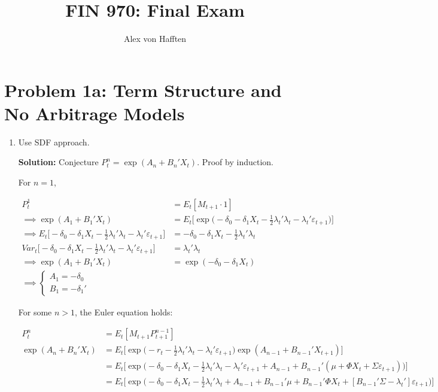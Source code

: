 \documentclass{article}
\title{FIN 970: Final Exam}
\author{Alex von Hafften}
\begin{document}
\maketitle

\section{Problem 1a: Term Structure and No Arbitrage Models}

\begin{enumerate}

\item Use SDF approach.

\textbf{Solution:} Conjecture $P_t^n = \exp(A_n + B_n'X_t)$. Proof by induction.

For $n=1$,

\begin{align*}
P_t^1 
&= 
E_t[M_{t+1} \cdot 1]\\
\implies\exp(A_1 + B_1'X_t) 
&= 
E_t \Bigg[ \exp \Bigg(-\delta_0 - \delta_1 X_t - \frac{1}{2} \lambda_t'\lambda_t - \lambda_t' \varepsilon_{t+1}\Bigg) \Bigg]\\
\implies E_t \Bigg[ -\delta_0 - \delta_1 X_t - \frac{1}{2} \lambda_t'\lambda_t - \lambda_t' \varepsilon_{t+1} \Bigg]
&= -\delta_0 -\delta_1 X_t - \frac{1}{2}\lambda_t'\lambda_t \\
Var_t\Bigg[ -\delta_0 - \delta_1 X_t - \frac{1}{2} \lambda_t'\lambda_t - \lambda_t' \varepsilon_{t+1} \Bigg]
&= \lambda_t'\lambda_t\\
\implies
\exp(A_1 + B_1'X_t) 
&= 
\exp (-\delta_0 - \delta_1 X_t ) \\
\implies
\begin{cases}
A_1 = -\delta_0\\
B_1 = -\delta_1'
\end{cases}
\end{align*}

For some $n>1$, the Euler equation holds:

\begin{align*}
P_t^n &= E_t[M_{t+1} P_{t+1}^{n-1}]\\
\exp(A_{n} + B_{n}'X_{t})
&= E_t \Bigg[\exp \Bigg(-r_t - \frac{1}{2} \lambda_t'\lambda_t - \lambda_t' \varepsilon_{t+1}\Bigg) \exp(A_{n-1} + B_{n-1}'X_{t+1})\Bigg]\\
&= E_t \Bigg[\exp \Bigg(-\delta_0 - \delta_1 X_t - \frac{1}{2} \lambda_t'\lambda_t - \lambda_t' \varepsilon_{t+1} + A_{n-1} + B_{n-1}'(\mu + \Phi X_t + \Sigma \varepsilon_{t+1} ) \Bigg)\Bigg]\\
&= E_t \Bigg[\exp \Bigg(-\delta_0 - \delta_1 X_t - \frac{1}{2} \lambda_t'\lambda_t  + A_{n-1} + B_{n-1}'\mu + B_{n-1}'\Phi X_t + [B_{n-1}'\Sigma - \lambda_t'] \varepsilon_{t+1}  \Bigg)\Bigg]
\end{align*}


\end{enumerate}
\end{document}
